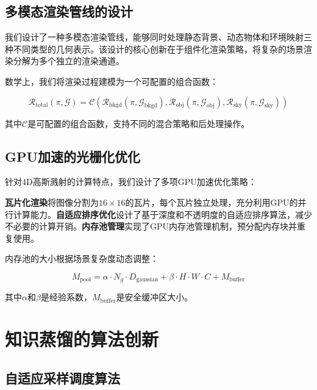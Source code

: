 \subsection{多模态渲染管线的设计}

我们设计了一种多模态渲染管线，能够同时处理静态背景、动态物体和环境映射三种不同类型的几何表示。该设计的核心创新在于组件化渲染策略，将复杂的场景渲染分解为多个独立的渲染通道。

数学上，我们将渲染过程建模为一个可配置的组合函数：

\begin{equation}
\mathcal{R}_{\text{total}}(\pi, \mathcal{G}) = \mathcal{C}(\mathcal{R}_{\text{bkgd}}(\pi, \mathcal{G}_{\text{bkgd}}), \mathcal{R}_{\text{obj}}(\pi, \mathcal{G}_{\text{obj}}), \mathcal{R}_{\text{sky}}(\pi, \mathcal{G}_{\text{sky}}))
\label{eq:modular_rendering}
\end{equation}

其中$\mathcal{C}$是可配置的组合函数，支持不同的混合策略和后处理操作。

\subsection{GPU加速的光栅化优化}

针对4D高斯溅射的计算特点，我们设计了多项GPU加速优化策略：

\textbf{瓦片化渲染}将图像分割为$16 \times 16$的瓦片，每个瓦片独立处理，充分利用GPU的并行计算能力。\textbf{自适应排序优化}设计了基于深度和不透明度的自适应排序算法，减少不必要的计算开销。\textbf{内存池管理}实现了GPU内存池管理机制，预分配内存块并重复使用。

内存池的大小根据场景复杂度动态调整：

\begin{equation}
M_{\text{pool}} = \alpha \cdot N_g \cdot D_{\text{gaussian}} + \beta \cdot H \cdot W \cdot C + M_{\text{buffer}}
\label{eq:memory_pool_sizing}
\end{equation}

其中$\alpha$和$\beta$是经验系数，$M_{\text{buffer}}$是安全缓冲区大小。

\section{知识蒸馏的算法创新}

\subsection{自适应采样调度算法}

